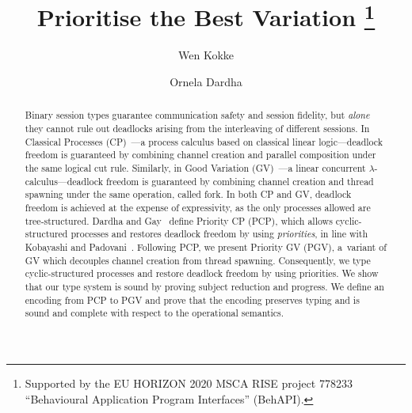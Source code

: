 \documentclass[citecolor=red,linkcolor=blue,runningheads]{llncs}
\newcommand{\onlyinsubfile}[1]{#1}
\newcommand{\notinsubfile}[1]{}
\begin{document}
%
\renewcommand{\onlyinsubfile}[1]{}
\renewcommand{\notinsubfile}[1]{#1}
%
\title{Prioritise the Best Variation %
 \thanks{Supported by the EU HORIZON 2020 MSCA RISE project 778233 ``Behavioural Application Program Interfaces'' (BehAPI).}
}
%
\author{
  Wen Kokke%
  \and%
  Ornela Dardha%
  }
%
%
%
\maketitle
%
\begin{abstract}
%
Binary session types guarantee communication safety and session fidelity, but \emph{alone} they cannot rule out deadlocks arising from the interleaving of {different} sessions.
In Classical Processes (CP)~\cite{wadler14}---a process calculus based on classical linear logic---deadlock freedom is guaranteed by combining channel creation and parallel composition under the same logical cut rule. Similarly, in Good Variation (GV)~\cite{wadler15,lindleymorris15}---a linear concurrent $\lambda$-calculus---deadlock freedom is guaranteed by combining channel creation and thread spawning under the same operation, called fork.
%
In both CP and GV, deadlock freedom is achieved at the expense of expressivity, as the only processes allowed are tree-structured. Dardha and Gay~\cite{dardhagay18} define Priority CP (PCP), which allows cyclic-structured processes and restores deadlock freedom by using \emph{priorities}, in line with Kobayashi and Padovani~\cite{kobayashi06,padovani14}.
%
Following PCP, we present Priority GV (PGV), a~variant of GV which decouples channel creation from thread spawning. Consequently, we type cyclic-structured processes and restore deadlock freedom by using priorities. We show that our type system is sound by proving subject reduction and progress. We define an encoding from PCP to PGV and prove that the encoding preserves typing and is sound and complete with respect to the operational semantics.
\end{abstract}

{}
{}
{}
{}

\clearpage



\end{document}
